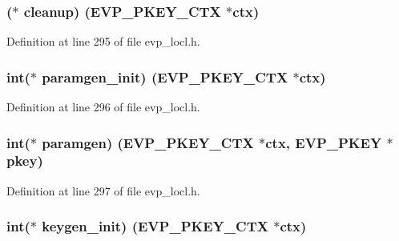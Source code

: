 \subsubsection[{\texorpdfstring{cleanup}{cleanup}}]{($\ast$ cleanup) ({\bf E\+V\+P\+\_\+\+P\+K\+E\+Y\+\_\+\+C\+TX} $\ast$ctx)}\hypertarget{structevp__pkey__method__st_ad9db33d86d70609a446294f2543e931f}{}\label{structevp__pkey__method__st_ad9db33d86d70609a446294f2543e931f}


Definition at line 295 of file evp\+\_\+locl.\+h.

\subsubsection[{\texorpdfstring{paramgen\+\_\+init}{paramgen_init}}]{\setlength{\rightskip}{0pt plus 5cm}int($\ast$ paramgen\+\_\+init) ({\bf E\+V\+P\+\_\+\+P\+K\+E\+Y\+\_\+\+C\+TX} $\ast$ctx)}\hypertarget{structevp__pkey__method__st_a5edf7a6110c87d258012d89ed9afe02f}{}\label{structevp__pkey__method__st_a5edf7a6110c87d258012d89ed9afe02f}


Definition at line 296 of file evp\+\_\+locl.\+h.

\subsubsection[{\texorpdfstring{paramgen}{paramgen}}]{\setlength{\rightskip}{0pt plus 5cm}int($\ast$ paramgen) ({\bf E\+V\+P\+\_\+\+P\+K\+E\+Y\+\_\+\+C\+TX} $\ast$ctx, {\bf E\+V\+P\+\_\+\+P\+K\+EY} $\ast$pkey)}\hypertarget{structevp__pkey__method__st_af50379bcd5912a5922f07c161d37d6c3}{}\label{structevp__pkey__method__st_af50379bcd5912a5922f07c161d37d6c3}


Definition at line 297 of file evp\+\_\+locl.\+h.

\subsubsection[{\texorpdfstring{keygen\+\_\+init}{keygen_init}}]{\setlength{\rightskip}{0pt plus 5cm}int($\ast$ keygen\+\_\+init) ({\bf E\+V\+P\+\_\+\+P\+K\+E\+Y\+\_\+\+C\+TX} $\ast$ctx)}\hypertarget{structevp__pkey__method__st_a4033d8ed5780379caf8eff1ac339a767}{}\label{structevp__pkey__method__st_a4033d8ed5780379caf8eff1ac339a767}


